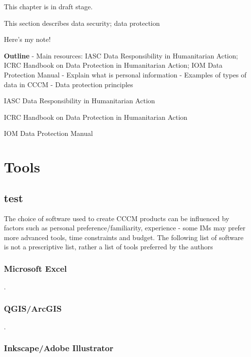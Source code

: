 \documentclass[
  a4paper,
  onecolumn,
  oneside]{book}
\begin{document}
This chapter is in draft stage.

This section describes data security; data protection

Here's my note!

\textbf{Outline} - Main resources: IASC Data Responsibility in
Humanitarian Action; ICRC Handbook on Data Protection in Humanitarian
Action; IOM Data Protection Manual - Explain what is personal
information - Examples of types of data in CCCM - Data protection
principles

IASC Data Responsibility in Humanitarian Action

ICRC Handbook on Data Protection in Humanitarian Action

IOM Data Protection Manual

\hypertarget{tools}{%
\chapter{Tools}\label{tools}}

\hypertarget{test}{%
\section{test}\label{test}}

The choice of software used to create CCCM products can be influenced by
factors such as personal preference/familiarity, experience - some IMs
may prefer more advanced tools, time constraints and budget. The
following list of software is not a prescriptive list, rather a list of
tools preferred by the authors

\hypertarget{microsoft-excel}{%
\subsection{Microsoft Excel}\label{microsoft-excel}}

.

\hypertarget{qgisarcgis}{%
\subsection{QGIS/ArcGIS}\label{qgisarcgis}}

.

\hypertarget{inkscapeadobe-illustrator}{%
\subsection{Inkscape/Adobe
Illustrator}\label{inkscapeadobe-illustrator}}
\end{document}
